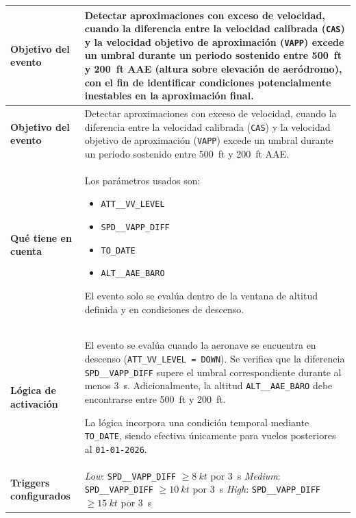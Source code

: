 \documentclass[11pt,a4paper]{article}
\begin{document}
	\renewcommand{\arraystretch}{1.3}
	\begin{longtable}{p{5cm} p{9.5cm}}
		\hline
		\textbf{Objetivo del evento} &
		Detectar aproximaciones con exceso de velocidad, cuando la diferencia entre la velocidad calibrada (\texttt{CAS}) y la velocidad objetivo de aproximación (\texttt{VAPP}) excede un umbral durante un periodo sostenido entre \SI{500}{ft} y \SI{200}{ft} AAE (altura sobre elevación de aeródromo), con el fin de identificar condiciones potencialmente inestables en la aproximación final. \\
		\hline
		\endfirsthead
		
		\hline
		\textbf{Objetivo del evento} &
		Detectar aproximaciones con exceso de velocidad, cuando la diferencia entre la velocidad calibrada (\texttt{CAS}) y la velocidad objetivo de aproximación (\texttt{VAPP}) excede un umbral durante un periodo sostenido entre \SI{500}{ft} y \SI{200}{ft} AAE. \\
		\hline
		\endhead
		
		\hline
		\endfoot
		
		\hline
		\endlastfoot
		
		\textbf{Qué tiene en cuenta} &
		Los parámetros usados son:
		\begin{itemize}
			\item \texttt{ATT\_\_VV\_LEVEL}
			\item \texttt{SPD\_\_VAPP\_DIFF}
			\item \texttt{TO\_DATE}
			\item \texttt{ALT\_\_AAE\_BARO}
		\end{itemize}
		El evento solo se evalúa dentro de la ventana de altitud definida y en condiciones de descenso. \\
		\hline
		
		\textbf{Lógica de activación} &
		El evento se evalúa cuando la aeronave se encuentra en descenso (\texttt{ATT\_VV\_LEVEL = DOWN}). Se verifica que la diferencia \texttt{SPD\_\_VAPP\_DIFF} supere el umbral correspondiente durante al menos \SI{3}{s}. Adicionalmente, la altitud \texttt{ALT\_\_AAE\_BARO} debe encontrarse entre \SI{500}{ft} y \SI{200}{ft}.  
		
		La lógica incorpora una condición temporal mediante \texttt{TO\_DATE}, siendo efectiva únicamente para vuelos posteriores al \texttt{01-01-2026}. \\
		\hline
		
		\textbf{Triggers configurados} &
		\textit{Low}: \texttt{SPD\_\_VAPP\_DIFF} $\ge \SI{8}{kt}$ por \SI{3}{s} \newline
		\textit{Medium}: \texttt{SPD\_\_VAPP\_DIFF} $\ge \SI{10}{kt}$ por \SI{3}{s} \newline
		\textit{High}: \texttt{SPD\_\_VAPP\_DIFF} $\ge \SI{15}{kt}$ por \SI{3}{s} \\
		\hline
		

\end{longtable}
\end{document}
